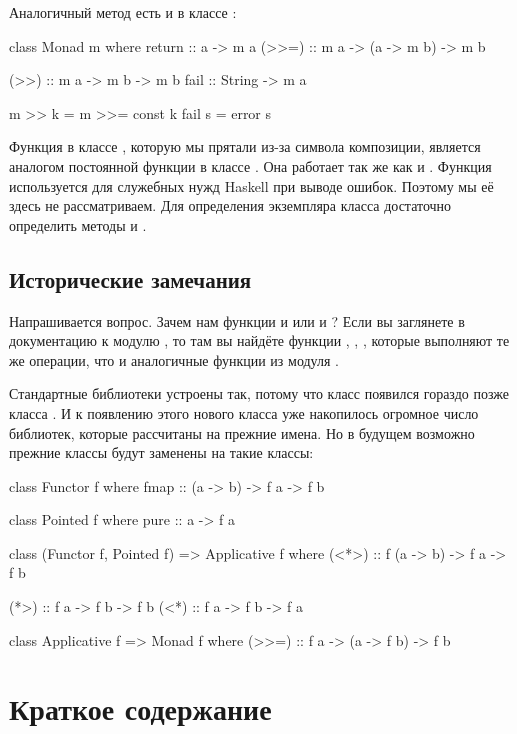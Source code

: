 Аналогичный метод есть и в классе :


\begin{code}
class  Monad m  where
    return  :: a -> m a
    (>>=)   :: m a -> (a -> m b) -> m b
    
    (>>)    :: m a -> m b -> m b
    fail    :: String -> m a

    m >> k  = m >>= const k
    fail s  = error s
\end{code}

Функция \In{>>} в классе , которую мы прятали из-за символа
композиции, является аналогом постоянной функции в классе .
Она работает так же как и \In{*>}. Функция  используется для
служебных нужд Haskell при выводе ошибок. Поэтому мы её здесь не
рассматриваем. Для определения экземпляра класса  достаточно
определить методы  и \In{>>=}.

\subsection{Исторические замечания}

Напрашивается вопрос. Зачем нам функции  и  или
\In{*>} и \In{>>}? Если вы заглянете в документацию к модулю
, то там вы найдёте функции , ,
, которые выполняют те же операции, что и аналогичные функции
из модуля .

Стандартные библиотеки устроены так, потому что класс 
появился гораздо позже класса . И к появлению этого нового
класса уже накопилось огромное число библиотек, которые рассчитаны на
прежние имена. Но в будущем возможно прежние классы будут заменены на
такие классы:


\begin{code}
class Functor f where
    fmap :: (a -> b) -> f a -> f b

class Pointed f where
    pure :: a -> f a

class (Functor f, Pointed f) => Applicative f where
    (<*>) :: f (a -> b) -> f a -> f b

    (*>)  :: f a -> f b -> f b
    (<*)  :: f a -> f b -> f a

class Applicative f => Monad f where
    (>>=) :: f a -> (a -> f b) -> f b
\end{code}

\section{Краткое содержание}

